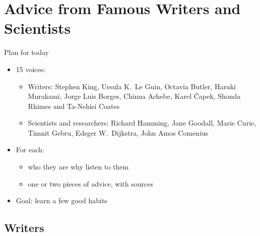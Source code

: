 \documentclass[aspectratio=169]{beamer}
\begin{document}
\section{Advice from Famous Writers and Scientists}
\begin{frame}{Plan for today}
  \begin{itemize}
    \item 15 voices:
      \begin{itemize}
        \item Writers: Stephen King, Ursula K.~Le Guin, Octavia Butler, Haruki Murakami, Jorge Luis Borges, Chinua Achebe, Karel \v{C}apek, Shonda Rhimes and Ta-Nehisi Coates
        \item Scientists and researchers: Richard Hamming, Jane Goodall, Marie Curie, Timnit Gebru, Edsger W.~Dijkstra, John Amos Comenius
      \end{itemize}
    \item For each:
      \begin{itemize}
        \item who they are \textrightarrow{} why listen to them
        \item one or two pieces of advice, with sources
      \end{itemize}
    \item Goal: learn a few good habits
  \end{itemize}
\end{frame}

\subsection{Writers}
\label{sec:writers}


\end{document}
